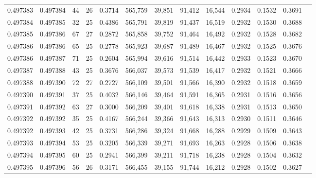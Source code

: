 \begin{tabular}{rrrrrrrrrrrrr}
0.497383 & 0.497384 &  44 &  26 &                                     0.3714 & 565,759 &  39,851 &  91,412 &  16,544 & 0.2934 & 0.1532 & 0.3691 \\
0.497384 & 0.497385 &  32 &  25 &                                     0.4386 & 565,791 &  39,819 &  91,437 &  16,519 & 0.2932 & 0.1530 & 0.3688 \\
0.497385 & 0.497386 &  67 &  27 &                                     0.2872 & 565,858 &  39,752 &  91,464 &  16,492 & 0.2932 & 0.1528 & 0.3682 \\
0.497386 & 0.497386 &  65 &  25 &                                     0.2778 & 565,923 &  39,687 &  91,489 &  16,467 & 0.2932 & 0.1525 & 0.3676 \\
0.497386 & 0.497387 &  71 &  25 &                                     0.2604 & 565,994 &  39,616 &  91,514 &  16,442 & 0.2933 & 0.1523 & 0.3670 \\
0.497387 & 0.497388 &  43 &  25 &                                     0.3676 & 566,037 &  39,573 &  91,539 &  16,417 & 0.2932 & 0.1521 & 0.3666 \\
0.497388 & 0.497390 &  72 &  27 &                                     0.2727 & 566,109 &  39,501 &  91,566 &  16,390 & 0.2932 & 0.1518 & 0.3659 \\
0.497390 & 0.497391 &  37 &  25 &                                     0.4032 & 566,146 &  39,464 &  91,591 &  16,365 & 0.2931 & 0.1516 & 0.3656 \\
0.497391 & 0.497392 &  63 &  27 &                                     0.3000 & 566,209 &  39,401 &  91,618 &  16,338 & 0.2931 & 0.1513 & 0.3650 \\
0.497392 & 0.497392 &  35 &  25 &                                     0.4167 & 566,244 &  39,366 &  91,643 &  16,313 & 0.2930 & 0.1511 & 0.3646 \\
0.497392 & 0.497393 &  42 &  25 &                                     0.3731 & 566,286 &  39,324 &  91,668 &  16,288 & 0.2929 & 0.1509 & 0.3643 \\
0.497393 & 0.497394 &  53 &  25 &                                     0.3205 & 566,339 &  39,271 &  91,693 &  16,263 & 0.2928 & 0.1506 & 0.3638 \\
0.497394 & 0.497395 &  60 &  25 &                                     0.2941 & 566,399 &  39,211 &  91,718 &  16,238 & 0.2928 & 0.1504 & 0.3632 \\
0.497395 & 0.497396 &  56 &  26 &                                     0.3171 & 566,455 &  39,155 &  91,744 &  16,212 & 0.2928 & 0.1502 & 0.3627 \\

\end{tabular}
